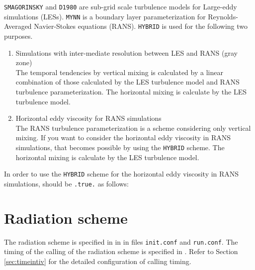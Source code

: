 \verb|SMAGORINSKY| and \verb|D1980| are sub-grid scale turbulence models for Large-eddy simulations (LESs).
\verb|MYNN| is a boundary layer parameterization for Reynolds-Averaged Navier-Stokes equations (RANS).
\verb|HYBRID| is used for the following two purposes.
\begin{enumerate}
\item Simulations with inter-mediate resolution between LES and RANS (gray zone) \\
  The temporal tendencies by vertical mixing is calculated by a linear combination of those calculated by the LES turbulence model and RANS turbulence parameterization. The horizontal mixing is calculate by the LES turbulence model.
\item Horizontal eddy viscosity for RANS simulations \\
  The RANS turbulence parameterization is a scheme considering only vertical mixing.
  If you want to consider the horizontal eddy viscosity in RANS simulations,
  that becomes possible by using the \verb|HYBRID| scheme.
  The horizontal mixing is calculate by the LES turbulence model.
\end{enumerate}

In order to use the \verb|HYBRID| scheme for the horizontal eddy viscosity in RANS simulations,  should be \verb|.true.| as follows:


\section{Radiation scheme} \label{sec:basic_usel_radiation}
The radiation scheme is specified in  in  in files \verb|init.conf| and \verb|run.conf|. The timing of the calling of the radiation scheme is specified in .  Refer to Section \ref{sec:timeintiv} for the detailed configuration of calling timing.

\\

